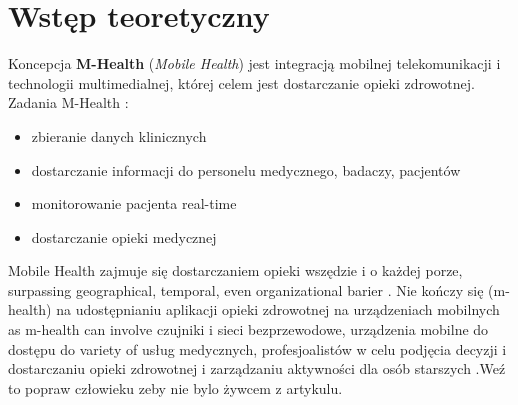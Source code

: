 \chapter{Wstęp teoretyczny}
\label{cha:wstep_teoretyczny}

Koncepcja \textbf{M-Health} (\emph{Mobile Health}) jest integracją mobilnej telekomunikacji i technologii multimedialnej, której celem jest dostarczanie opieki zdrowotnej.\\
Zadania M-Health \cite{5969916} :
\begin{itemize}
\item zbieranie danych klinicznych
\item dostarczanie informacji do personelu medycznego, badaczy, pacjentów
\item monitorowanie pacjenta real-time
\item dostarczanie opieki medycznej
\end{itemize}
Mobile Health zajmuje się dostarczaniem opieki wszędzie i o każdej porze, surpassing geographical, temporal, even organizational barier \cite{6655256}. Nie kończy się (m-health) na udostępnianiu aplikacji opieki zdrowotnej na urządzeniach mobilnych as m-health can involve czujniki i sieci bezprzewodowe, urządzenia mobilne do dostępu do variety of usług medycznych, profesjoalistów w celu podjęcia decyzji i dostarczaniu opieki zdrowotnej i zarządzaniu aktywności dla osób starszych \cite{Varshney2014}.Weź to popraw człowieku zeby nie bylo żywcem z artykulu.